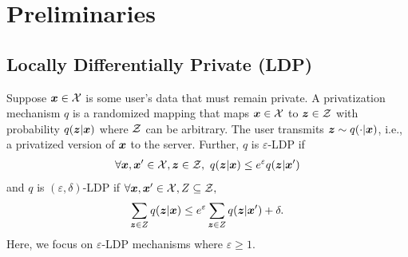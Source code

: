 \section{Preliminaries}
\label{sec:preliminaries}
\subsection{Locally Differentially Private (LDP)}
Suppose ${\boldsymbol{x}} \in \mathcal{X}$ is some user's data that must remain private.  A privatization mechanism $q$ is a randomized mapping that maps ${\boldsymbol{x}} \in \mathcal{X}$ to ${\boldsymbol{z}} \in \mathcal{Z}$ with probability $q({\boldsymbol{z}}|{\boldsymbol{x}})$ where $\mathcal{Z}$ can be arbitrary. The user transmits ${\boldsymbol{z}} \sim q(\cdot|{\boldsymbol{x}})$, i.e., a privatized version of ${\boldsymbol{x}}$ to the server. Further, $q$ is $\varepsilon$-LDP if 
\begin{align}
    \forall {\boldsymbol{x}}, {\boldsymbol{x}}' \in \mathcal{X}, {\boldsymbol{z}} \in \mathcal{Z}, ~ q({\boldsymbol{z}}|{\boldsymbol{x}}) \leq e^{\varepsilon} q({\boldsymbol{z}}|{\boldsymbol{x}}')  \label{eq:ldp}
\end{align}
and $q$ is $(\varepsilon, \delta)$-LDP if $\forall {\boldsymbol{x}}, {\boldsymbol{x}}' \in \mathcal{X}, Z \subseteq \mathcal{Z},$
$$\sum_{{\boldsymbol{z}} \in Z} q({\boldsymbol{z}}|{\boldsymbol{x}}) \leq e^{\varepsilon} \sum_{{\boldsymbol{z}} \in Z} q({\boldsymbol{z}}|{\boldsymbol{x}}') + \delta.$$
Here, we focus on $\varepsilon$-LDP mechanisms where $\varepsilon \geq 1$.


